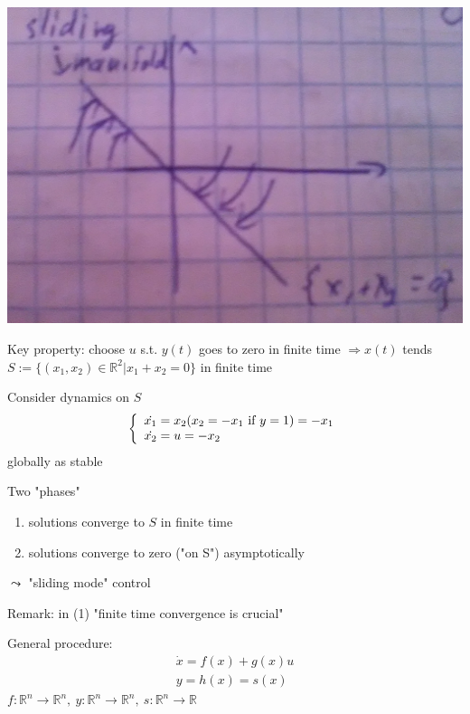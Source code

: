\begin{center}
	\includegraphics[scale=0.1]{1}
\end{center}

Key property: choose $u$ s.t. $y(t)$ goes to zero in finite time $\Rightarrow x(t)$ tends $S := \{ (x_1, x_2) \in \mathbb{R}^2 | x_1 +x_2 = 0 \}$ in finite time

Consider dynamics on $S$
\begin{equation*}
\left\{ \begin{array}{l}
                  \dot{x_1} = x_2 (x_2 = -x_1 \ $if$ \  y =1) = -x_1\\
                 \dot{x_2} = u = -x_2
                \end{array}
              \right. 
\end{equation*} 
globally as stable

Two "phases"
\begin{enumerate}
\item solutions converge to $S$ in finite time
\item solutions converge to zero ("on S") asymptotically
\end{enumerate}
$\leadsto $ "sliding mode" control

Remark: in (1) "finite time convergence is crucial"

General procedure:
\begin{equation*}
\begin{split}
\dot{x} = f(x)+g(x)u \\
y = h(x)= s(x)
\end{split}
\end{equation*}
$f: \mathbb{R}^n \to \mathbb{R}^n, \  y : \mathbb{R}^n \to \mathbb{R}^n, \ s: \mathbb{R}^n \to \mathbb{R}$

